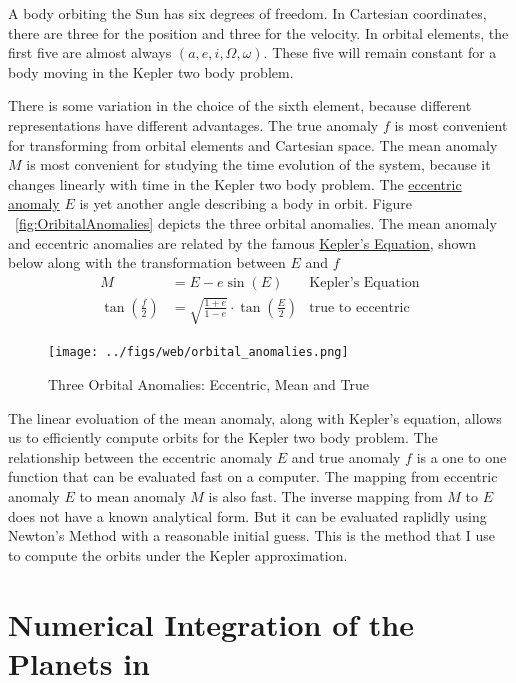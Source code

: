 A body orbiting the Sun has six degrees of freedom.  
In Cartesian coordinates, there are three for the position and three for the velocity.
In orbital elements, the first five are almost always $(a, e, i, \Omega, \omega)$.
These five will remain constant for a body moving in the Kepler two body problem.

There is some variation in the choice of the sixth element, because different representations have different advantages.
The true anomaly $f$ is most convenient for transforming from orbital elements and Cartesian space.
The mean anomaly $M$ is most convenient for studying the time evolution of the system, because it changes linearly with time in the Kepler two body problem.
The \href{https://en.wikipedia.org/wiki/Eccentric_anomaly}{eccentric anomaly} $E$ is yet another angle describing a body in orbit.
Figure ~\ref{fig:OribitalAnomalies} depicts the three orbital anomalies.
The mean anomaly and eccentric anomalies are related by the famous 
\href{https://en.wikipedia.org/wiki/Kepler\%27s_equation}{Kepler's Equation},
shown below along with the transformation between $E$ and $f$
\begin{align*}
M &= E - e \sin(E) & \textrm{Kepler's Equation} \\
\tan \left(\frac{f}{2} \right) &= \sqrt{\frac{1+e}{1-e}} \cdot \tan \left( \frac{E}{2} \right) &\textrm{true to eccentric}
\end{align*}

\begin{figure}
\begin{center}
\texttt{[image: ../figs/web/orbital\_anomalies.png]}
\end{center}
\caption{Three Orbital Anomalies: Eccentric, Mean and True}
\label{fig:OrbitalAnomalies}
\end{figure}
 
The linear evoluation of the mean anomaly, along with Kepler's equation, allows us to efficiently compute orbits for the Kepler two body problem.
The relationship between the eccentric anomaly $E$ and true anomaly $f$ is a one to one function that can be evaluated fast on a computer.
The mapping from eccentric anomaly $E$ to mean anomaly $M$ is also fast.
The inverse mapping from $M$ to $E$ does not have a known analytical form.
But it can be evaluated raplidly using Newton's Method with a reasonable initial guess.
This is the method that I use to compute the orbits under the Kepler approximation. 

\section{Numerical Integration of the Planets in }
\label{section_numerical_integration}

